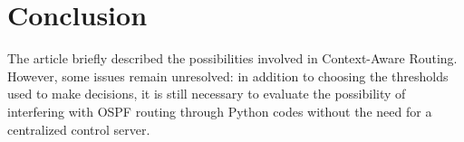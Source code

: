 \section{Conclusion}

The article briefly described the possibilities involved in Context-Aware Routing. However, some issues remain unresolved: in addition to choosing the thresholds used to make decisions, it is still necessary to evaluate the possibility of interfering with OSPF routing through Python codes without the need for a centralized control server.


